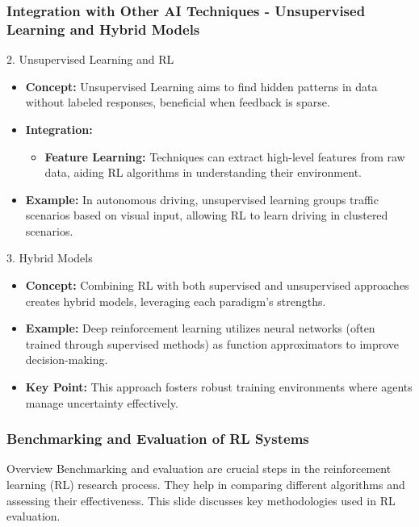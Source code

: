 \documentclass{beamer}
\begin{document}
\begin{frame}[fragile]
    \frametitle{Integration with Other AI Techniques - Unsupervised Learning and Hybrid Models}
    \begin{block}{2. Unsupervised Learning and RL}
        \begin{itemize}
            \item \textbf{Concept:}
                Unsupervised Learning aims to find hidden patterns in data without labeled responses, beneficial when feedback is sparse.
                
            \item \textbf{Integration:} 
                \begin{itemize}
                    \item \textbf{Feature Learning:} Techniques can extract high-level features from raw data, aiding RL algorithms in understanding their environment.
                \end{itemize}
                
            \item \textbf{Example:}
                In autonomous driving, unsupervised learning groups traffic scenarios based on visual input, allowing RL to learn driving in clustered scenarios.
        \end{itemize}
    \end{block}
    
    \begin{block}{3. Hybrid Models}
        \begin{itemize}
            \item \textbf{Concept:} 
                Combining RL with both supervised and unsupervised approaches creates hybrid models, leveraging each paradigm's strengths.

            \item \textbf{Example:} 
                Deep reinforcement learning utilizes neural networks (often trained through supervised methods) as function approximators to improve decision-making.
                
            \item \textbf{Key Point:}
                This approach fosters robust training environments where agents manage uncertainty effectively.
        \end{itemize}
    \end{block}
\end{frame}

\begin{frame}[fragile]
    \frametitle{Benchmarking and Evaluation of RL Systems}
    \begin{block}{Overview}
        Benchmarking and evaluation are crucial steps in the reinforcement learning (RL) research process. They help in comparing different algorithms and assessing their effectiveness. This slide discusses key methodologies used in RL evaluation.
    \end{block}
\end{frame}
\end{document}
